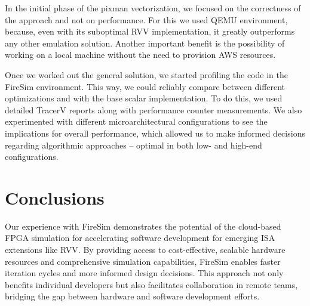 \documentclass[
	a4paper, %
	10pt, %
	unnumberedsections, %
	twoside, %
]{LTJournalArticle}
\begin{document}
In the initial phase of the pixman vectorization, we focused on the correctness
of the approach and not on performance. For this we used QEMU environment,
because, even with its suboptimal RVV implementation, it greatly outperforms any
other emulation solution. Another important benefit is the possibility of
working on a local machine without the need to provision AWS resources.

Once we worked out the general solution, we started profiling the code in the
FireSim environment. This way, we could reliably compare between different
optimizations and with the base scalar implementation. To do this, we used
detailed TracerV reports along with performance counter measurements. We also
experimented with different microarchitectural configurations to see the
implications for overall performance, which allowed us to make informed
decisions regarding algorithmic approaches --  optimal in both low- and high-end
configurations.

\section{Conclusions}

Our experience with FireSim demonstrates the potential of the cloud-based FPGA
simulation for accelerating software development for emerging ISA extensions
like RVV. By providing access to cost-effective, scalable hardware resources and
comprehensive simulation capabilities, FireSim enables faster iteration cycles
and more informed design decisions. This approach not only benefits individual
developers but also facilitates collaboration in remote teams, bridging the gap
between hardware and software development efforts.


\printbibliography %

\end{document}
